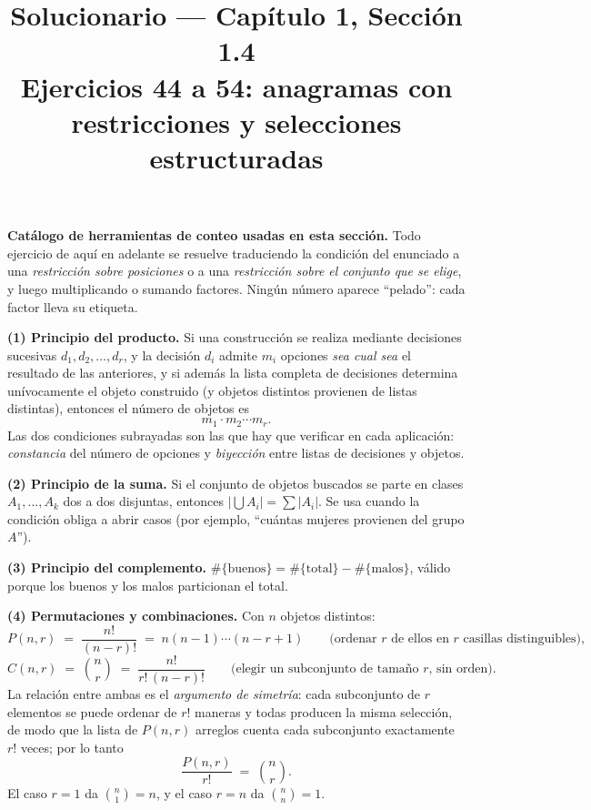 \documentclass[11pt]{article}
\title{Solucionario --- Cap\'itulo 1, Secci\'on 1.4\\ Ejercicios 44 a 54: anagramas con restricciones y selecciones estructuradas}
\author{}
\date{}
\begin{document}
\maketitle

\begin{teo}
\textbf{Cat\'alogo de herramientas de conteo usadas en esta secci\'on.} Todo ejercicio de aqu\'i en adelante
se resuelve traduciendo la condici\'on del enunciado a una \emph{restricci\'on sobre posiciones} o a una
\emph{restricci\'on sobre el conjunto que se elige}, y luego multiplicando o sumando factores. Ning\'un
n\'umero aparece ``pelado'': cada factor lleva su etiqueta.

\medskip
\textbf{(1) Principio del producto.} Si una construcci\'on se realiza mediante decisiones sucesivas
$d_1,d_2,\dots,d_r$, y la decisi\'on $d_i$ admite $m_i$ opciones \emph{sea cual sea} el resultado de las
anteriores, y si adem\'as la lista completa de decisiones determina un\'ivocamente el objeto construido
(y objetos distintos provienen de listas distintas), entonces el n\'umero de objetos es
\[
m_1\cdot m_2\cdots m_r .
\]
Las dos condiciones subrayadas son las que hay que verificar en cada aplicaci\'on: \emph{constancia} del
n\'umero de opciones y \emph{biyecci\'on} entre listas de decisiones y objetos.

\medskip
\textbf{(2) Principio de la suma.} Si el conjunto de objetos buscados se parte en clases
$A_1,\dots,A_k$ dos a dos disjuntas, entonces $\big|\bigcup A_i\big| = \sum |A_i|$. Se usa cuando la
condici\'on obliga a abrir casos (por ejemplo, ``cu\'antas mujeres provienen del grupo $A$'').

\medskip
\textbf{(3) Principio del complemento.} $\#\{\text{buenos}\} = \#\{\text{total}\} - \#\{\text{malos}\}$,
v\'alido porque los buenos y los malos particionan el total.

\medskip
\textbf{(4) Permutaciones y combinaciones.} Con $n$ objetos distintos:
\[
P(n,r)\;=\;\frac{n!}{(n-r)!}\;=\;n(n-1)\cdots(n-r+1)
\qquad\text{(ordenar $r$ de ellos en $r$ casillas distinguibles)},
\]
\[
C(n,r)\;=\;\binom{n}{r}\;=\;\frac{n!}{r!\,(n-r)!}
\qquad\text{(elegir un subconjunto de tama\~no $r$, sin orden)} .
\]
La relaci\'on entre ambas es el \emph{argumento de simetr\'ia}: cada subconjunto de $r$ elementos se puede
ordenar de $r!$ maneras y todas producen la misma selecci\'on, de modo que la lista de $P(n,r)$ arreglos
cuenta cada subconjunto exactamente $r!$ veces; por lo tanto
\[
\frac{P(n,r)}{r!}\;=\;\binom{n}{r}.
\]
El caso $r=1$ da $\binom{n}{1}=n$, y el caso $r=n$ da $\binom{n}{n}=1$.


\end{teo}
\end{document}
